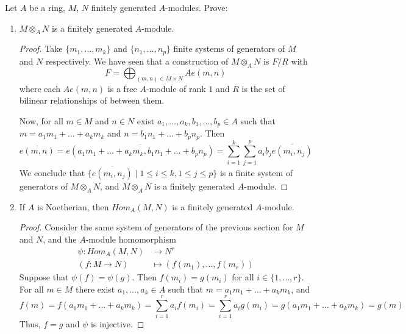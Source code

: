 \begin{problem}
    Let $A$ be a ring, $M$, $N$ finitely generated $A$-modules.
    Prove:
    \begin{enumerate}[label=(\theproblem.\arabic*),ref=\theproblem.\arabic*]
        \item $M \otimes_A N$ is a finitely generated $A$-module.
            \begin{sol}
                \begin{proof}
                    Take $\{m_1, \dots, m_k\}$ and $\{n_1, \dots, n_p\}$ finite systems of generators of $M$ and $N$ respectively.
                    We have seen that a construction of $M \otimes_A N$ is $F/R$ with
                    \[ F = \bigoplus_{(m,n) \in M \times N} A e(m,n)\]
                    where each $A e(m,n)$ is a free $A$-module of rank $1$ and $R$ is the set of bilinear relationships of between them.

                    Now, for all $m \in M$ and $n \in N$ exist $a_1, \dots, a_k, b_1, \dots, b_p \in A$ such that \linebreak
                    ${m = a_1 m_1 + \dots + a_k m_k}$
                    and ${n = b_1 n_1 + \dots + b_p n_p}$.
                    Then
                    \[
                       \overline{e(m,n)} = \overline{e(a_1 m_1 + \dots + a_k m_k, b_1 n_1 + \dots + b_p n_p)}
                       = \sum_{i=1}^{k}\sum_{j=1}^{p} a_i b_j \overline{e(m_i, n_j)}
                    \]
                    We conclude that $\{\overline{e(m_i, n_j)}\mid 1 \leq i \leq k, 1 \leq j \leq p\}$
                    is a finite system of generators of $M \otimes_A N$,
                    and $M \otimes_A N$ is a finitely generated $A$-module.
                \end{proof}
            \end{sol}
        \item If $A$ is Noetherian, then $Hom_A(M,N)$ is a finitely generated $A$-module.
            \begin{sol}
                \begin{proof}
                    Consider the same system of generators of the previous section for $M$ and $N$, and the $A$-module homomorphism
                    \begin{align*}
                        \psi\colon Hom_A(M,N) &\to N^r \\
                        (f: M \rightarrow N) &\mapsto (f(m_1), \dots, f(m_r))
                    \end{align*}
                    Suppose that $\psi(f) = \psi(g)$.
                    Then $f(m_i) = g(m_i)$ for all $i \in \{1, \dots, r\}$.
                    For all $m \in M$ there exist $a_1, \dots, a_k \in A$ such that $m = a_1 m_1 + \dots + a_k m_k$, and
                    \[
                        f(m) = f(a_1 m_1 + \dots + a_k m_k) = \sum_{i=1}^{r} a_i f(m_i) = \sum_{i=1}^{r} a_i g(m_i) = g(a_1 m_1 + \dots + a_k m_k) = g(m)
                    \]
                    Thus, $f = g$ and $\psi$ is injective.


\end{proof}
\end{sol}
\end{enumerate}
\end{problem}
